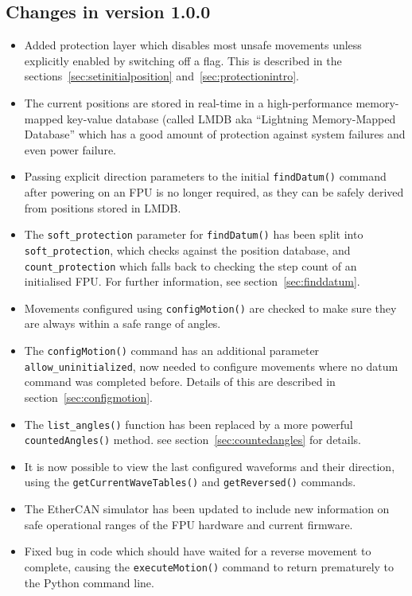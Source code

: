 \documentclass[11pt,a4paper]{scrartcl}
\begin{document}
\subsection*{Changes in version 1.0.0}
\begin{itemize}
\item Added protection layer which disables most unsafe movements
  unless explicitly enabled by switching off a flag. This is described
  in the sections~\ref{sec:setinitialposition}
  and~\ref{sec:protectionintro}.

\item The current positions are stored in real-time in a
  high-performance memory-mapped key-value database (called LMDB aka
  ``Lightning Memory-Mapped Database'' which has a good amount of
  protection against system failures and even power failure.

\item Passing explicit direction parameters to the initial
  \texttt{findDatum()} command after powering on an FPU is no longer
  required, as they can be safely derived from positions stored in
  LMDB.

\item The \texttt{soft\_protection} parameter for \texttt{findDatum()}
  has been split into \texttt{soft\_protection}, which checks against
  the position database, and \texttt{count\_protection} which falls
  back to checking the step count of an initialised FPU. For further
  information, see section~\ref{sec:finddatum}.

\item Movements configured using \texttt{configMotion()} are checked
  to make sure they are always within a safe range of angles.  
  
\item The \texttt{configMotion()} command has an additional parameter
  \texttt{allow\_uninitialized}, now needed to configure movements
  where no datum command was completed before. Details of this are
  described in section~\ref{sec:configmotion}.

\item The \texttt{list\_angles()} function has been replaced by a more
  powerful \texttt{countedAngles()} method. see
  section~\ref{sec:countedangles} for details.

\item It is now possible to view the last configured waveforms and
  their direction, using the \texttt{getCurrentWaveTables()} and
  \texttt{getReversed()} commands.
 
\item The EtherCAN simulator has been updated to include new
  information on safe operational ranges of the FPU hardware and
  current firmware.
  
\item Fixed bug in code which should have waited for a reverse
  movement to complete, causing the \texttt{executeMotion()} command
  to return prematurely to the Python command line.
  
\end{itemize}
\end{document}
